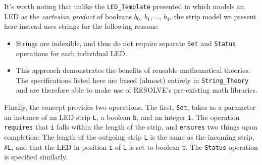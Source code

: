 
It's worth noting that unlike the \texttt{LED\_Template} presented in \cite{regula:2010} which models an LED as the \textit{cartesian product} of booleans $b_0$, $b_1$, \ldots , $b_4$, the strip model we present here instead uses strings for the following reasons:
\begin{itemize}
\item Strings are indexible, and thus do not require separate \texttt{Set} and \texttt{Status} operations for each individual LED.
\item This approach demonstrates the benefits of reusable mathematical theories. The specifications listed here are based (almost) entirely in \texttt{String\_Theory} and are therefore able to make use of RESOLVE's pre-existing math libraries.
\end{itemize}

Finally, the concept provides two operations. The first, \texttt{Set}, takes as a parameter an instance of an LED strip \texttt{L}, a boolean \texttt{b}, and an integer \texttt{i}. The operation \texttt{requires} that \texttt{i} falls within the length of the strip, and \texttt{ensures} two things upon completion: The length of the outgoing strip \texttt{L} is the same as the incoming strip, \texttt{\#L}, and that the LED in position \texttt{i} of \texttt{L} is set to boolean \texttt{b}. The \texttt{Status} operation is specified similarly. 

